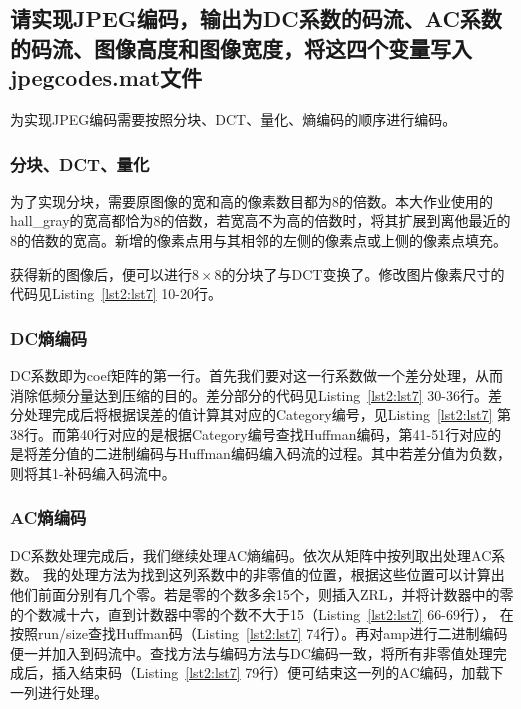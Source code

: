 \documentclass[a4paper]{article}
\begin{document}
		\subsection{请实现JPEG编码，输出为DC系数的码流、AC系数的码流、图像高度和图像宽度，将这四个变量写入jpegcodes.mat文件}
		
		为实现JPEG编码需要按照分块、DCT、量化、熵编码的顺序进行编码。
		
		\subsubsection{分块、DCT、量化}
		
		为了实现分块，需要原图像的宽和高的像素数目都为8的倍数。本大作业使用的hall\_gray的宽高都恰为8的倍数，若宽高不为高的倍数时，将其扩展到离他最近的8的倍数的宽高。新增的像素点用与其相邻的左侧的像素点或上侧的像素点填充。
		
		获得新的图像后，便可以进行$8 \times 8$的分块了与DCT变换了。修改图片像素尺寸的代码见Listing~\ref{lst2:lst7} 10-20行。
		
		\subsubsection{DC熵编码}
		
		DC系数即为coef矩阵的第一行。首先我们要对这一行系数做一个差分处理，从而消除低频分量达到压缩的目的。差分部分的代码见Listing~\ref{lst2:lst7} 30-36行。差分处理完成后将根据误差的值计算其对应的Category编号，见Listing~\ref{lst2:lst7} 第38行。而第40行对应的是根据Category编号查找Huffman编码，第41-51行对应的是将差分值的二进制编码与Huffman编码编入码流的过程。其中若差分值为负数，则将其1-补码编入码流中。
		
		\subsubsection{AC熵编码}
		
		DC系数处理完成后，我们继续处理AC熵编码。依次从矩阵中按列取出处理AC系数。	我的处理方法为找到这列系数中的非零值的位置，根据这些位置可以计算出他们前面分别有几个零。若是零的个数多余15个，则插入ZRL，并将计数器中的零的个数减十六，直到计数器中零的个数不大于15（Listing~\ref{lst2:lst7} 66-69行），
		在按照run/size查找Huffman码（Listing~\ref{lst2:lst7} 74行）。再对amp进行二进制编码便一并加入到码流中。查找方法与编码方法与DC编码一致，将所有非零值处理完成后，插入结束码（Listing~\ref{lst2:lst7} 79行）便可结束这一列的AC编码，加载下一列进行处理。
		
		
		
		
\end{document}
